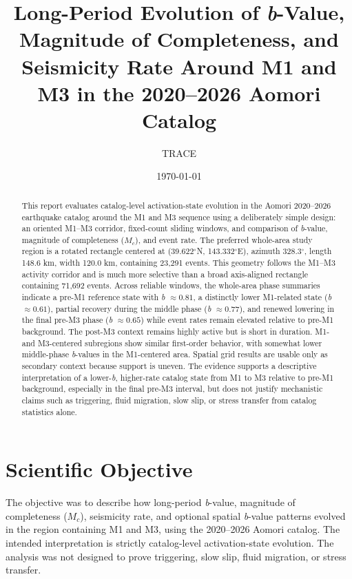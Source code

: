 \documentclass[11pt]{article}
\title{Long-Period Evolution of \textit{b}-Value, Magnitude of Completeness, and Seismicity Rate Around M1 and M3 in the 2020--2026 Aomori Catalog}
\author{TRACE}
\date{\today}
\begin{document}
\maketitle

\begin{abstract}
This report evaluates catalog-level activation-state evolution in the Aomori 2020--2026 earthquake catalog around the M1 and M3 sequence using a deliberately simple design: an oriented M1--M3 corridor, fixed-count sliding windows, and comparison of \textit{b}-value, magnitude of completeness ($M_c$), and event rate. The preferred whole-area study region is a rotated rectangle centered at (39.622$^{\circ}$N, 143.332$^{\circ}$E), azimuth 328.3$^{\circ}$, length 148.6 km, width 120.0 km, containing 23,291 events. This geometry follows the M1--M3 activity corridor and is much more selective than a broad axis-aligned rectangle containing 71,692 events. Across reliable windows, the whole-area phase summaries indicate a pre-M1 reference state with \textit{b} $\approx 0.81$, a distinctly lower M1-related state (\textit{b} $\approx 0.61$), partial recovery during the middle phase (\textit{b} $\approx 0.77$), and renewed lowering in the final pre-M3 phase (\textit{b} $\approx 0.65$) while event rates remain elevated relative to pre-M1 background. The post-M3 context remains highly active but is short in duration. M1- and M3-centered subregions show similar first-order behavior, with somewhat lower middle-phase \textit{b}-values in the M1-centered area. Spatial grid results are usable only as secondary context because support is uneven. The evidence supports a descriptive interpretation of a lower-\textit{b}, higher-rate catalog state from M1 to M3 relative to pre-M1 background, especially in the final pre-M3 interval, but does not justify mechanistic claims such as triggering, fluid migration, slow slip, or stress transfer from catalog statistics alone.
\end{abstract}

\section{Scientific Objective}
The objective was to describe how long-period \textit{b}-value, magnitude of completeness ($M_c$), seismicity rate, and optional spatial \textit{b}-value patterns evolved in the region containing M1 and M3, using the 2020--2026 Aomori catalog. The intended interpretation is strictly catalog-level activation-state evolution. The analysis was not designed to prove triggering, slow slip, fluid migration, or stress transfer.
\end{document}
